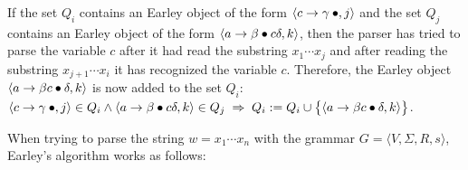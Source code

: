\begin{enumerate}
      If the set $Q_i$ contains an Earley object of the form $\pair(c \rightarrow \gamma \mdot, j)$
      and the set $Q_j$ contains an Earley object of the form 
      $\pair(a \rightarrow \beta \mdot c \delta,k)$, then the parser has tried to parse the variable $c$
      after it had read the substring $x_1\cdots x_{j}$ and after reading the substring $x_{j+1}\cdots x_i$
      it has recognized the variable $c$.
      Therefore, the Earley object
      $\pair(a \rightarrow \beta c \mdot \delta,k)$
      is now added to the set $Q_i$:
      \\[0.2cm]
      \hspace*{1.3cm}
      $\pair(c \rightarrow \gamma \mdot, j) \in Q_i \wedge
       \pair(a \rightarrow \beta \mdot c \delta,k) \in Q_j \;\Rightarrow\;
       Q_i := Q_i \cup \bigl\{ \pair(a \rightarrow \beta c \mdot \delta,k) \bigr\}
      $.
\end{enumerate}
When trying to parse the string $w = x_1 \cdots x_n$ with the grammar
$G = \langle V, \Sigma, R, s \rangle$, Earley's algorithm works as follows:
